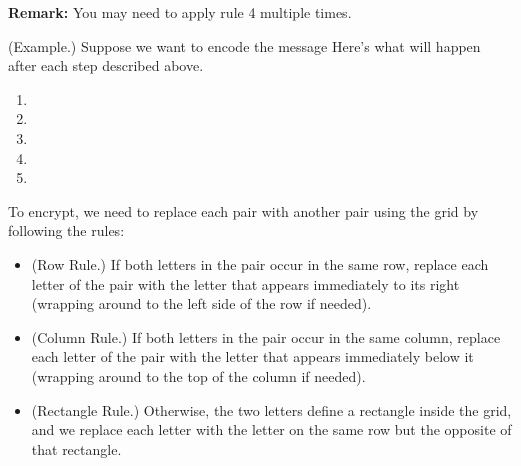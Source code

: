 \documentclass[letterpaper]{article}
\newcommand{\0}{\mathbf{0}}
\begin{document}
\textbf{Remark:} You may need to apply rule 4 multiple times. 

\begin{mdframed}
    (Example.) Suppose we want to encode the message  Here's what will happen after each step described above. 
    \begin{enumerate}
        \item {}
        \item {}
        \item {}
        \item {}
        \item {}
    \end{enumerate}
\end{mdframed}

To encrypt, we need to replace each pair with another pair using the grid by following the rules: 
\begin{itemize}
    \item (Row Rule.) If both letters in the pair occur in the same row, replace each letter of the pair with the letter that appears immediately to its right (wrapping around to the left side of the row if needed).
    \item (Column Rule.) If both letters in the pair occur in the same column, replace each letter of the pair with the letter that appears immediately below it (wrapping around to the top of the column if needed).
    \item (Rectangle Rule.) Otherwise, the two letters define a rectangle inside the grid, and we replace each letter with the letter on the same row but the opposite of that rectangle.
\end{itemize}
\end{document}
